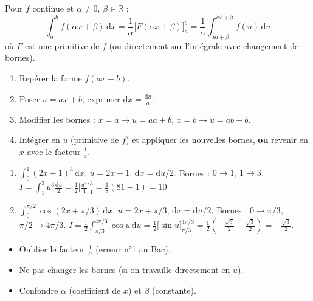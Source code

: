 \documentclass[11pt]{article}
\begin{document}
\begin{propriete}
Pour $f$ continue et $\alpha\ne 0$, $\beta\in\mathbb{R}$ :
\[
\int_a^b f(\alpha x+\beta)\,\mathrm{d}x = \frac{1}{\alpha}\Big[F(\alpha x+\beta)\Big]_a^b = \frac{1}{\alpha}\int_{\alpha a+\beta}^{\alpha b+\beta} f(u)\,\mathrm{d}u
\]
où $F$ est une primitive de $f$ (ou directement sur l'intégrale avec changement de bornes).
\end{propriete}

\begin{methode}
\begin{enumerate}
  \item Repérer la forme $f(ax+b)$.
  \item Poser $u = ax+b$, exprimer $\mathrm{d}x = \frac{\mathrm{d}u}{a}$.
  \item Modifier les bornes : $x=a \to u=aa+b$, $x=b \to u=ab+b$.
  \item Intégrer en $u$ (primitive de $f$) et appliquer les nouvelles bornes, \textbf{ou} revenir en $x$ avec le facteur $\frac{1}{a}$.
\end{enumerate}
\end{methode}

\begin{exemplebox}
\begin{enumerate}
  \item $\int_0^1 (2x+1)^3\,\mathrm{d}x$. $u=2x+1$, $\mathrm{d}x=\mathrm{d}u/2$. Bornes : $0\to 1$, $1\to 3$.
  $I = \int_1^3 u^3 \frac{\mathrm{d}u}{2} = \frac{1}{2}\big[\frac{u^4}{4}\big]_1^3 = \frac{1}{8}(81-1)=10$.
  \item $\int_0^{\pi/2} \cos(2x+\pi/3)\,\mathrm{d}x$. $u=2x+\pi/3$, $\mathrm{d}x=\mathrm{d}u/2$. Bornes : $0\to \pi/3$, $\pi/2\to 4\pi/3$.
  $I = \frac{1}{2}\int_{\pi/3}^{4\pi/3} \cos u\,\mathrm{d}u = \frac{1}{2}\big[\sin u\big]_{\pi/3}^{4\pi/3} = \frac{1}{2}(-\frac{\sqrt{3}}{2} - \frac{\sqrt{3}}{2}) = -\frac{\sqrt{3}}{2}$.
\end{enumerate}
\end{exemplebox}

\begin{attention}
\begin{itemize}
  \item Oublier le facteur $\frac{1}{\alpha}$ (erreur n°1 au Bac).
  \item Ne pas changer les bornes (si on travaille directement en $u$).
  \item Confondre $\alpha$ (coefficient de $x$) et $\beta$ (constante).
\end{itemize}
\end{attention}
\end{document}
